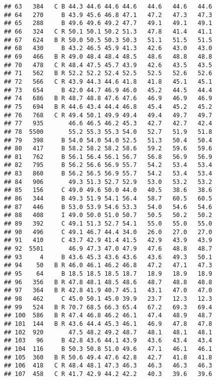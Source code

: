 \documentclass[]{article}
\begin{document}
\begin{verbatim}
## 63   384   C B 44.3 44.6 44.6 44.6   44.6   44.6   44.6
## 64   270     B 43.9 45.6 46.8 47.1   47.2   47.3   47.3
## 65   288     B 49.6 49.6 49.2 47.7   49.1   49.1   49.1
## 66   324   C R 50.1 50.1 50.2 51.3   47.8   41.4   41.1
## 67   624   B R 50.0 50.5 50.3 50.3   51.1   51.5   51.5
## 68   430     B 43.2 46.5 45.9 41.3   42.6   43.0   43.0
## 69   466   B R 49.0 48.4 48.4 48.5   48.6   48.8   48.8
## 70   478   C R 48.4 47.5 45.7 43.9   42.6   43.5   43.5
## 71   562   B R 52.2 52.2 52.4 52.5   52.5   52.6   52.6
## 72   566   C R 43.9 44.3 44.6 41.8   41.8   45.1   45.1
## 73   654     B 42.0 44.7 46.9 46.0   45.2   44.5   44.4
## 74   686   B R 48.7 48.8 47.6 47.6   46.9   46.9   46.9
## 75   694   B R 44.6 43.4 44.4 46.8   45.4   45.2   45.2
## 76   768   C R 49.4 50.1 49.9 49.4   49.4   49.7   49.7
## 77   935       46.6 46.5 46.2 45.3   42.7   42.7   42.4
## 78  5500       55.2 55.3 55.3 54.0   52.7   51.9   51.8
## 79   398     B 54.0 54.0 54.0 52.5   51.3   50.4   50.4
## 80   417     B 58.2 58.2 58.2 58.6   59.2   59.6   59.6
## 81   762     B 56.1 56.4 56.1 56.7   56.8   56.9   56.9
## 82   795     B 56.2 56.6 56.9 55.7   54.2   53.4   53.4
## 83   860     B 56.2 56.5 56.9 55.7   54.2   53.4   53.4
## 84   906       49.3 51.3 52.7 52.9   53.0   53.2   53.2
## 85   156     C 49.0 49.6 50.0 44.0   40.5   38.6   38.6
## 86   344     B 49.3 51.9 54.1 56.4   58.7   60.5   60.5
## 87   446     B 53.0 53.9 54.6 53.3   54.0   54.6   54.6
## 88   408     I 49.0 50.0 51.0 50.7   50.5   50.2   50.2
## 89   392     C 49.1 51.3 52.7 54.1   55.0   55.0   55.0
## 90   496     C 49.1 46.7 44.4 34.0   26.0   27.0   27.0
## 91   410     C 43.7 42.9 41.4 41.5   42.9   43.9   43.9
## 92  5501       46.9 47.3 47.0 47.9   47.6   48.8   48.7
## 93     4     B 43.6 45.3 43.6 43.6   43.6   49.3   50.1
## 94    50   B R 46.0 46.1 46.2 46.8   47.2   47.1   47.3
## 95    64     B 18.5 18.5 18.5 18.7   18.9   18.9   18.9
## 96   356   B R 47.8 48.1 48.5 48.6   48.7   48.8   48.8
## 97   364   B R 42.8 41.9 40.7 45.1   43.1   47.0   47.0
## 98   462     C 45.0 50.1 45.0 39.9   23.7   12.3   12.3
## 99   524   B R 70.7 68.5 66.3 65.4   67.2   69.3   69.4
## 100  586   B R 47.4 46.8 46.2 46.1   47.4   48.9   48.7
## 101  144   B R 43.6 44.4 45.3 46.1   46.9   47.8   47.8
## 102  920       47.5 48.2 49.2 48.7   48.1   48.1   48.1
## 103   96     B 42.8 43.6 44.1 43.9   43.6   43.4   43.4
## 104  116     B 50.3 50.8 51.0 49.6   47.1   46.1   46.1
## 105  360   B R 50.6 49.4 47.6 42.8   42.7   41.8   41.8
## 106  418   C R 48.4 48.1 47.3 46.3   46.3   46.3   46.3
## 107  458   C R 41.7 42.9 44.2 42.2   40.3   39.6   39.6

\end{verbatim}
\end{document}
